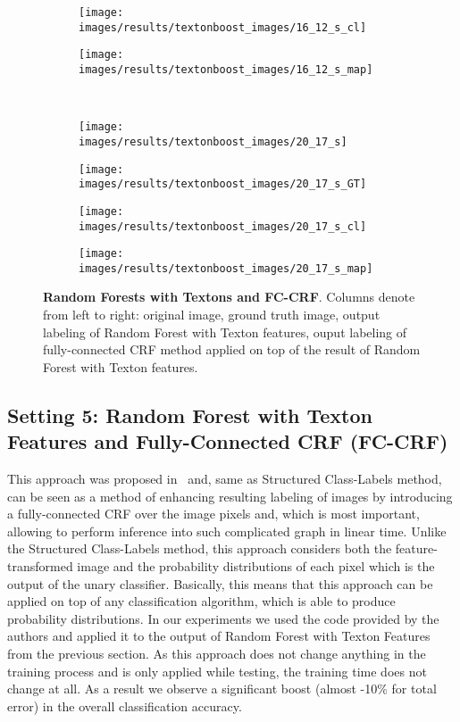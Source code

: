 \begin{figure}[t]
\begin{subfigure}[c]{0.24\textwidth}
  \centering
  \texttt{[image: images/results/textonboost\_images/16\_12\_s\_cl]}
 \end{subfigure}
 \begin{subfigure}[c]{0.24\textwidth}
  \centering
  \texttt{[image: images/results/textonboost\_images/16\_12\_s\_map]}
 \end{subfigure}
 \\
 \begin{subfigure}[c]{0.24\textwidth}
  \centering
  \texttt{[image: images/results/textonboost\_images/20\_17\_s]}
 \end{subfigure}
 \begin{subfigure}[c]{0.24\textwidth}
  \centering
  \texttt{[image: images/results/textonboost\_images/20\_17\_s\_GT]}
 \end{subfigure}
 \begin{subfigure}[c]{0.24\textwidth}
  \centering
  \texttt{[image: images/results/textonboost\_images/20\_17\_s\_cl]}
 \end{subfigure}
 \begin{subfigure}[c]{0.24\textwidth}
  \centering
  \texttt{[image: images/results/textonboost\_images/20\_17\_s\_map]}
 \end{subfigure}
 \caption[Random Forests with Textons and FC-CRF]{{\bf Random Forests with Textons and FC-CRF}.
 Columns denote from left to right: original image, ground truth image, output labeling of Random Forest with Texton features, ouput labeling
 of fully-connected CRF method applied on top of the result of Random Forest with Texton features.}
 \label{fig:msrc_texton_boost}
\end{figure}

\subsection{Setting 5: Random Forest with Texton Features and Fully-Connected CRF (FC-CRF)}
\label{msrc_setting_5}
This approach was proposed in~\cite{Krahenbuhl2011} and, same as Structured Class-Labels method, can be seen as a method of enhancing resulting labeling
of images by introducing a fully-connected CRF over the image pixels and, which is most important, allowing to perform inference into such complicated
graph in linear time. Unlike the Structured Class-Labels method, this approach considers both the feature-transformed image and the probability distributions
of each pixel which is the output of the unary classifier. Basically, this means that this approach can be applied on top of any classification
algorithm, which is able to produce probability distributions. In our experiments we used the code provided by the authors and applied it to the output of
Random Forest with Texton Features from the previous section. As this approach does not change anything in the training process and is only applied while
testing, the training time does not change at all. As a result we observe a significant boost (almost -10\% for total error) in the overall
classification accuracy.

